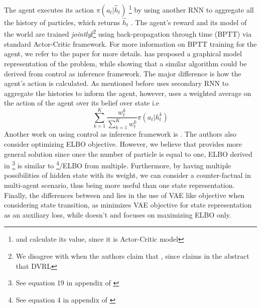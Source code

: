 The agent executes its action $\pi(a_t | \hat{h}_t)$ \footnote{and calculate its value, since it is Actor-Critic model} by using another RNN to aggregate all the history of particles, which returns $\hat{h}_t$ . The agent's reward and its model of the world are trained \textit{jointly}f\footnote{We disagree with \cite{huangsvqn} when the authors claim that \cite{igl2018deep} , since \cite{igl2018deep} claims in the abstract that DVRL } using back-propagation through time (BPTT) via standard Actor-Critic framework. For more information on BPTT training for the agent, we refer to the paper for more details. \cite{shvechikovjoint} has proposed a graphical model representation of the problem, while showing that a similar algorithm could be derived from control as inference framework. The major difference is how the agent's action is calculated. As mentioned before \cite{igl2018deep} uses secondary RNN to aggregate the histories to inform the agent, however, \cite{shvechikovjoint} uses a weighted average on the action of the agent over its belief over state i.e
\begin{equation}
    \sum^K_{k=1} \frac{w^k_{t}}{\sum^K_{k=1}w^k_{t}} \pi(a_t | h_t^k)
\end{equation}
Another work on using control as inference framework is \cite{huangsvqn}. The authors also consider optimizing ELBO objective. However, we believe that \cite{shvechikovjoint} provides more general solution since once the number of particle is equal to one, ELBO derived in \cite{huangsvqn}\footnote{See equation 19 in appendix of \cite{huangsvqn}} is similar to \cite{shvechikovjoint}\footnote{See equation 4 in appendix of \cite{shvechikovjoint}}/ELBO from multiple. Furthermore, by having multiple possibilities of hidden state with its weight, we can consider a counter-factual in multi-agent scenario, thus being more useful than one state representation. Finally, the differences between \cite{huangsvqn} and \cite{shvechikovjoint} lies in the use of VAE like objective when considering state transition, as \cite{huangsvqn} minimizes VAE objective for state representation as an auxiliary loss, while \cite{shvechikovjoint} doesn't and focuses on maximizing ELBO only.